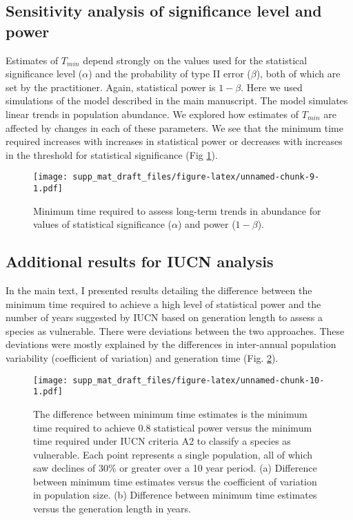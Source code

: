 \documentclass[12pt,]{article}
\begin{document}
\pagebreak

\subsection{Sensitivity analysis of significance level and
power}\label{sensitivity-analysis-of-significance-level-and-power}

Estimates of \(T_{min}\) depend strongly on the values used for the
statistical significance level (\(\alpha\)) and the probability of type
II error (\(\beta\)), both of which are set by the practitioner. Again,
statistical power is \(1-\beta\). Here we used simulations of the model
described in the main manuscript. The model simulates linear trends in
population abundance. We explored how estimates of \(T_{min}\) are
affected by changes in each of these parameters. We see that the minimum
time required increases with increases in statistical power or decreases
with increases in the threshold for statistical significance (Fig
\ref{fig:min_time_vs_alpha_beta}).

\begin{figure}
\centering
\texttt{[image: supp\_mat\_draft\_files/figure-latex/unnamed-chunk-9-1.pdf]}
\caption{Minimum time required to assess long-term trends in abundance
for values of statistical significance (\(\alpha\)) and power
(\(1-\beta\)).\label{fig:min_time_vs_alpha_beta}}
\end{figure}

\subsection{Additional results for IUCN
analysis}\label{additional-results-for-iucn-analysis}

In the main text, I presented results detailing the difference between
the minimum time required to achieve a high level of statistical power
and the number of years suggested by IUCN based on generation length to
assess a species as vulnerable. There were deviations between the two
approaches. These deviations were mostly explained by the differences in
inter-annual population variability (coefficient of variation) and
generation time (Fig. \ref{fig:IUCN_correlates}).

\begin{figure}
\centering
\texttt{[image: supp\_mat\_draft\_files/figure-latex/unnamed-chunk-10-1.pdf]}
\caption{The difference between minimum time estimates is the minimum
time required to achieve 0.8 statistical power versus the minimum time
required under IUCN criteria A2 to classify a species as vulnerable.
Each point represents a single population, all of which saw declines of
30\% or greater over a 10 year period. (a) Difference between minimum
time estimates versus the coefficient of variation in population size.
(b) Difference between minimum time estimates versus the generation
length in years.\label{fig:IUCN_correlates}}
\end{figure}
\end{document}
